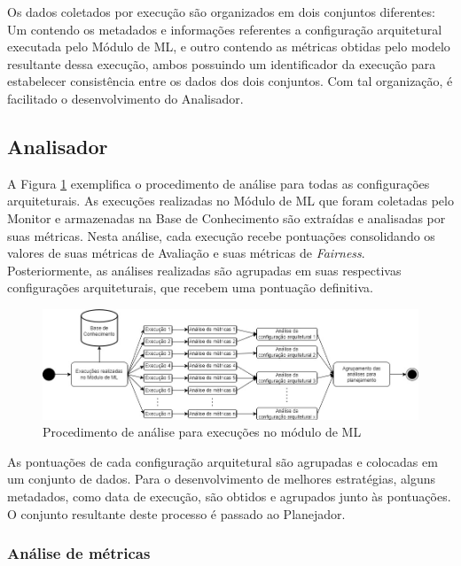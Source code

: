 \documentclass[portugues]{ic-tese}
\begin{document}
Os dados coletados por execução são organizados em dois conjuntos diferentes: Um contendo os metadados e informações referentes a configuração arquitetural executada pelo Módulo de ML, e outro contendo as métricas obtidas pelo modelo resultante dessa execução, ambos possuindo um identificador da execução para estabelecer consistência entre os dados dos dois conjuntos. Com tal organização, é facilitado o desenvolvimento do Analisador.

\subsection{Analisador}

A Figura \ref{fig:AnaliseModuloML} exemplifica o procedimento de análise para todas as configurações arquiteturais. As execuções realizadas no Módulo de ML que foram coletadas pelo Monitor e armazenadas na Base de Conhecimento são extraídas e analisadas por suas métricas. Nesta análise, cada execução recebe pontuações consolidando os valores de suas métricas de Avaliação e suas métricas de \textit{Fairness}. Posteriormente, as análises realizadas são agrupadas em suas respectivas configurações arquiteturais, que recebem uma pontuação definitiva. 

\begin{figure}[H]
\centering
\includegraphics[scale=0.5]{images/Procedimento_Analise.jpg}
\caption {Procedimento de análise para execuções no módulo de ML}
\label{fig:AnaliseModuloML}
\end{figure}

As pontuações de cada configuração arquitetural são agrupadas e colocadas em um conjunto de dados. Para o desenvolvimento de melhores estratégias, alguns metadados, como data de execução, são obtidos e agrupados junto às pontuações. O conjunto resultante deste processo é passado ao Planejador.

\subsubsection{Análise de métricas}
\end{document}
